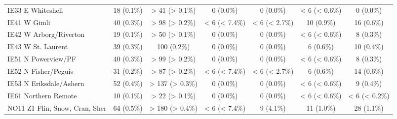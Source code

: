 \documentclass{article}
\begin{document}
\begin{table}[htbp]
\begin{tabular}{l*{6}{c}}
  IE33 E Whiteshell                                     &            18 (0.1\%)           &          > 41 (> 0.1\%)         &            0 (0.0\%)            &            0 (0.0\%)            &          < 6 (< 0.6\%)          &            0 (0.0\%)            \\
  IE41 W Gimli                                          &            40 (0.3\%)           &          > 98 (> 0.2\%)         &          < 6 (< 7.4\%)          &          < 6 (< 2.7\%)          &            10 (0.9\%)           &            16 (0.6\%)           \\
  IE42 W Arborg/Riverton                                &            19 (0.1\%)           &          > 50 (> 0.1\%)         &            0 (0.0\%)            &            0 (0.0\%)            &          < 6 (< 0.6\%)          &            8 (0.3\%)            \\
  IE43 W St. Laurent                                    &            39 (0.3\%)           &           100 (0.2\%)           &            0 (0.0\%)            &            0 (0.0\%)            &            6 (0.6\%)            &            10 (0.4\%)           \\
  IE51 N Powerview/PF                                   &            40 (0.3\%)           &          > 99 (> 0.2\%)         &            0 (0.0\%)            &            0 (0.0\%)            &          < 6 (< 0.6\%)          &            8 (0.3\%)            \\
  IE52 N Fisher/Peguis                                  &            31 (0.2\%)           &          > 87 (> 0.2\%)         &          < 6 (< 7.4\%)          &          < 6 (< 2.7\%)          &            6 (0.6\%)            &            14 (0.6\%)           \\
  IE53 N Eriksdale/Ashern                               &            52 (0.4\%)           &         > 137 (> 0.3\%)         &            0 (0.0\%)            &            0 (0.0\%)            &          < 6 (< 0.6\%)          &            9 (0.4\%)            \\
  IE61 Northern Remote                                  &            10 (0.1\%)           &          > 22 (> 0.1\%)         &            0 (0.0\%)            &            0 (0.0\%)            &          < 6 (< 0.6\%)          &          < 6 (< 0.2\%)          \\
  NO11 Z1 Flin, Snow, Cran, Sher                        &            64 (0.5\%)           &         > 180 (> 0.4\%)         &          < 6 (< 7.4\%)          &            9 (4.1\%)            &            11 (1.0\%)           &            28 (1.1\%)           \\

\end{tabular}
\end{table}
\end{document}
